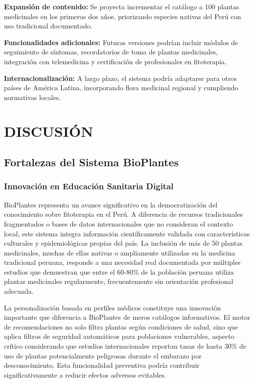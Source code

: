 \documentclass[12pt,a4paper]{article}
\begin{document}
\textbf{Expansión de contenido:} Se proyecta incrementar el catálogo a 100 plantas medicinales en los primeros dos años, priorizando especies nativas del Perú con uso tradicional documentado.

\textbf{Funcionalidades adicionales:} Futuras versiones podrían incluir módulos de seguimiento de síntomas, recordatorios de toma de plantas medicinales, integración con telemedicina y certificación de profesionales en fitoterapia.

\textbf{Internacionalización:} A largo plazo, el sistema podría adaptarse para otros países de América Latina, incorporando flora medicinal regional y cumpliendo normativas locales.


\section{DISCUSIÓN}

\subsection{Fortalezas del Sistema BioPlantes}

\subsubsection{Innovación en Educación Sanitaria Digital}

BioPlantes representa un avance significativo en la democratización del conocimiento sobre fitoterapia en el Perú. A diferencia de recursos tradicionales fragmentados o bases de datos internacionales que no consideran el contexto local, este sistema integra información científicamente validada con características culturales y epidemiológicas propias del país. La inclusión de más de 50 plantas medicinales, muchas de ellas nativas o ampliamente utilizadas en la medicina tradicional peruana, responde a una necesidad real documentada por múltiples estudios que demuestran que entre el 60-80\% de la población peruana utiliza plantas medicinales regularmente, frecuentemente sin orientación profesional adecuada.

La personalización basada en perfiles médicos constituye una innovación importante que diferencia a BioPlantes de meros catálogos informativos. El motor de recomendaciones no solo filtra plantas según condiciones de salud, sino que aplica filtros de seguridad automáticos para poblaciones vulnerables, aspecto crítico considerando que estudios internacionales reportan tasas de hasta 30\% de uso de plantas potencialmente peligrosas durante el embarazo por desconocimiento. Esta funcionalidad preventiva podría contribuir significativamente a reducir efectos adversos evitables.
\end{document}
